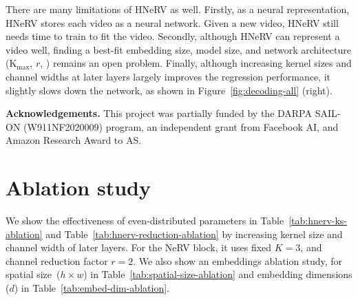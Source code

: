 \documentclass[10pt,twocolumn,letterpaper]{article}
\begin{document}
There are many limitations of HNeRV as well.
Firstly, as a neural representation, HNeRV stores each video as a neural network.
Given a new video, HNeRV still needs time to train to fit the video.
Secondly, although HNeRV can represent a video well, finding a best-fit embedding size, model size, and network architecture (K$_\text{max}$, $r$, \etc) remains an open problem.
Finally, although increasing kernel sizes and channel widths at later layers largely improves the regression performance, it slightly slows down the network, as shown in Figure~\ref{fig:decoding-all} (right).

\noindent\textbf{Acknowledgements.} This project was partially funded by the DARPA SAIL-ON (W911NF2020009) program, an independent grant from Facebook AI, and Amazon Research Award to AS.

\clearpage
{\small


}

\clearpage
\appendix

\setcounter{page}{1}

\section{Ablation study}
\label{subsec:ablation-study}

We show the effectiveness of even-distributed parameters in Table~\ref{tab:hnerv-ks-ablation} and Table~\ref{tab:hnerv-reduction-ablation} by increasing kernel size and channel width of later layers.
For the NeRV block, it uses fixed $K = 3$, and channel reduction factor $r = 2$.
We also show an embeddings ablation study, for spatial size~($h \times w$) in Table~\ref{tab:spatial-size-ablation} and embedding dimensions ($d$) in Table~\ref{tab:embed-dim-ablation}.
\end{document}
